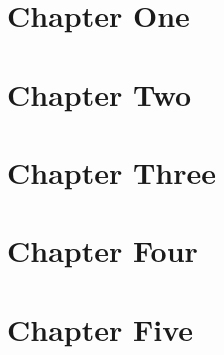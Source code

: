 \documentclass[twoside]{book}
\begin{document}
\cleardoublepage
\chapter{Chapter One\label{LinkToChapterOne}}
\lipsum

\cleardoublepage
\chapter{Chapter Two\label{LinkToChapterTwo}}
\lipsum

\cleardoublepage
\chapter{Chapter Three\label{LinkToChapterThree}}
\lipsum

\cleardoublepage
\chapter{Chapter Four\label{LinkToChapterFour}}
\lipsum

\cleardoublepage
\chapter{Chapter Five\label{LinkToChapterFive}}
\lipsum
\end{document}
